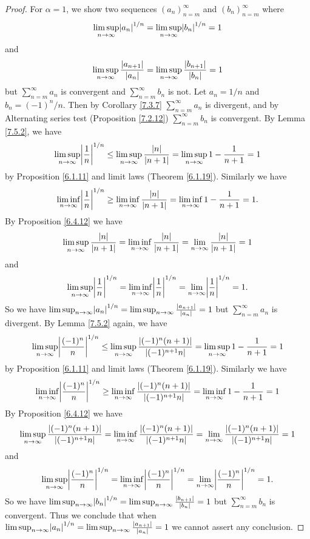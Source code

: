\begin{proof}
    For \(\alpha = 1\), we show two sequences \((a_n)_{n = m}^\infty\) and \((b_n)_{n = m}^\infty\) where
    \[
        \limsup_{n \to \infty} \abs*{a_n}^{1 / n} = \limsup_{n \to \infty} \abs*{b_n}^{1 / n} = 1
    \]
    and
    \[
        \limsup_{n \to \infty} \frac{\abs*{a_{n + 1}}}{\abs*{a_n}} = \limsup_{n \to \infty} \frac{\abs*{b_{n + 1}}}{\abs*{b_n}} = 1
    \]
    but \(\sum_{n = m}^\infty a_n\) is convergent and \(\sum_{n = m}^\infty b_n\) is not.
    Let \(a_n = 1 / n\) and \(b_n = (-1)^n / n\).
    Then by Corollary \ref{7.3.7} \(\sum_{n = m}^\infty a_n\) is divergent, and by Alternating series test (Proposition \ref{7.2.12}) \(\sum_{n = m}^\infty b_n\) is convergent.
    By Lemma \ref{7.5.2}, we have
    \[
        \limsup_{n \to \infty} \abs*{\frac{1}{n}}^{1 / n} \leq \limsup_{n \to \infty} \frac{\abs*{n}}{\abs*{n + 1}} = \limsup_{n \to \infty} 1 - \frac{1}{n + 1} = 1
    \]
    by Proposition \ref{6.1.11} and limit laws (Theorem \ref{6.1.19}).
    Similarly we have
    \[
        \liminf_{n \to \infty} \abs*{\frac{1}{n}}^{1 / n} \geq \liminf_{n \to \infty} \frac{\abs*{n}}{\abs*{n + 1}} = \liminf_{n \to \infty} 1 - \frac{1}{n + 1} = 1.
    \]
    By Proposition \ref{6.4.12} we have
    \[
        \limsup_{n \to \infty} \frac{\abs*{n}}{\abs*{n + 1}} = \liminf_{n \to \infty} \frac{\abs*{n}}{\abs*{n + 1}} = \lim_{n \to \infty} \frac{\abs*{n}}{\abs*{n + 1}} = 1
    \]
    and
    \[
        \limsup_{n \to \infty} \abs*{\frac{1}{n}}^{1 / n} = \liminf_{n \to \infty} \abs*{\frac{1}{n}}^{1 / n} = \lim_{n \to \infty} \abs*{\frac{1}{n}}^{1 / n} = 1.
    \]
    So we have \(\limsup_{n \to \infty} \abs*{a_n}^{1 / n} = \limsup_{n \to \infty} \frac{\abs*{a_{n + 1}}}{\abs*{a_n}} = 1\) but \(\sum_{n = m}^\infty a_n\) is divergent.
    By Lemma \ref{7.5.2} again, we have
    \[
        \limsup_{n \to \infty} \abs*{\frac{(-1)^n}{n}}^{1 / n} \leq \limsup_{n \to \infty} \frac{\abs*{(-1)^n (n + 1)}}{\abs*{(-1)^{n + 1} n}} = \limsup_{n \to \infty} 1 - \frac{1}{n + 1} = 1
    \]
    by Proposition \ref{6.1.11} and limit laws (Theorem \ref{6.1.19}).
    Similarly we have
    \[
        \liminf_{n \to \infty} \abs*{\frac{(-1)^n}{n}}^{1 / n} \geq \liminf_{n \to \infty} \frac{\abs*{(-1)^n (n + 1)}}{\abs*{(-1)^{n + 1} n}} = \liminf_{n \to \infty} 1 - \frac{1}{n + 1} = 1
    \]
    By Proposition \ref{6.4.12} we have
    \[
        \limsup_{n \to \infty} \frac{\abs*{(-1)^n (n + 1)}}{\abs*{(-1)^{n + 1} n}} = \liminf_{n \to \infty} \frac{\abs*{(-1)^n (n + 1)}}{\abs*{(-1)^{n + 1} n}} = \lim_{n \to \infty} \frac{\abs*{(-1)^n (n + 1)}}{\abs*{(-1)^{n + 1} n}} = 1
    \]
    and
    \[
        \limsup_{n \to \infty} \abs*{\frac{(-1)^n}{n}}^{1 / n} = \liminf_{n \to \infty} \abs*{\frac{(-1)^n}{n}}^{1 / n} = \lim_{n \to \infty} \abs*{\frac{(-1)^n}{n}}^{1 / n} = 1.
    \]
    So we have \(\limsup_{n \to \infty} \abs*{b_n}^{1 / n} = \limsup_{n \to \infty} \frac{\abs*{b_{n + 1}}}{\abs*{b_n}} = 1\) but \(\sum_{n = m}^\infty b_n\) is convergent.
    Thus we conclude that when \(\limsup_{n \to \infty} \abs*{a_n}^{1 / n} = \limsup_{n \to \infty} \frac{\abs*{a_{n + 1}}}{\abs*{a_n}} = 1\) we cannot assert any conclusion.
\end{proof}

